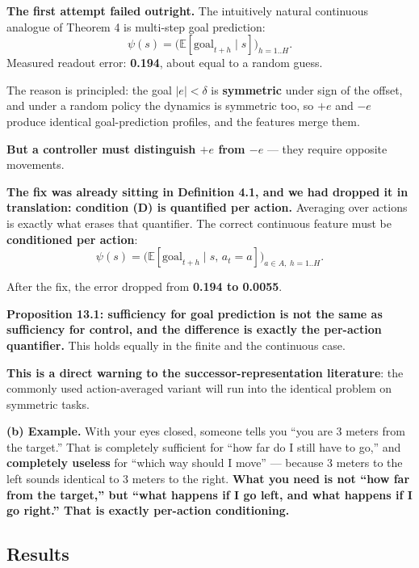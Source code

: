 \documentclass[11pt]{article}
\renewenvironment{quote}
  {\def\FrameCommand{{\color{gray!60}\vrule width 2pt}\hspace{8pt}}%
   \MakeFramed{\advance\hsize-\width \FrameRestore}\begin{itshape}}
  {\end{itshape}\endMakeFramed}
\begin{document}
\textbf{The first attempt failed outright.} The intuitively natural continuous analogue of Theorem 4 is multi-step goal prediction:
\[\psi(s)=\big(\mathbb E[\text{goal}_{t+h}\mid s]\big)_{h=1..H}.\]
Measured readout error: \textbf{0.194}, about equal to a random guess.

The reason is principled: the goal \(|e|<\delta\) is \textbf{symmetric} under sign of the offset, and under a random policy the dynamics is symmetric too, so \(+e\) and \(-e\) produce identical goal-prediction profiles, and the features merge them.

\textbf{But a controller must distinguish \(+e\) from \(-e\)} --- they require opposite movements.

\textbf{The fix was already sitting in Definition 4.1, and we had dropped it in translation: condition (D) is quantified per action.} Averaging over actions is exactly what erases that quantifier. The correct continuous feature must be \textbf{conditioned per action}:
\[\psi(s)=\big(\mathbb E[\text{goal}_{t+h}\mid s,\,a_t=a]\big)_{a\in A,\;h=1..H}.\]

After the fix, the error dropped from \textbf{0.194 to 0.0055}.

\begin{quote}
\textbf{Proposition 13.1: sufficiency for goal prediction is not the same as sufficiency for control, and the difference is exactly the per-action quantifier.} This holds equally in the finite and the continuous case.

\textbf{This is a direct warning to the successor-representation literature}: the commonly used action-averaged variant will run into the identical problem on symmetric tasks.
\end{quote}

\textbf{(b) Example.} With your eyes closed, someone tells you ``you are 3 meters from the target.'' That is completely sufficient for ``how far do I still have to go,'' and \textbf{completely useless} for ``which way should I move'' --- because 3 meters to the left sounds identical to 3 meters to the right. \textbf{What you need is not ``how far from the target,'' but ``what happens if I go left, and what happens if I go right.'' That is exactly per-action conditioning.}

\hypertarget{results-1}{%
\subsection{Results}\label{results-1}}
\end{document}

